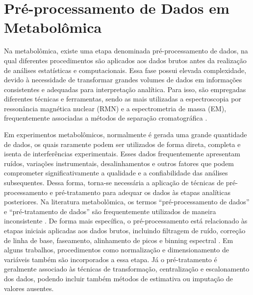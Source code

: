 \section{\textbf{Pré-processamento de Dados em Metabolômica}}

Na metabolômica, existe uma etapa denominada pré-processamento de dados, na qual diferentes procedimentos são aplicados aos dados brutos antes da realização de análises estatísticas e computacionais. Essa fase possui elevada complexidade, devido à necessidade de transformar grandes volumes de dados em informações consistentes e adequadas para interpretação analítica. Para isso, são empregadas diferentes técnicas e ferramentas, sendo as mais utilizadas a espectroscopia por ressonância magnética nuclear (RMN) e a espectrometria de massa (EM), frequentemente associadas a métodos de separação cromatográfica \cite{LILAND2011827}. 

Em experimentos metabolômicos, normalmente é gerada uma grande quantidade de dados, os quais raramente podem ser utilizados de forma direta, completa e isenta de interferências experimentais. Esses dados frequentemente apresentam ruídos, variações instrumentais, desalinhamentos e outros fatores que podem comprometer significativamente a qualidade e a confiabilidade das análises subsequentes. Dessa forma, torna-se necessária a aplicação de técnicas de pré-processamento e pré-tratamento para adequar os dados às etapas analíticas posteriores. Na literatura metabolômica, os termos “pré-processamento de dados” e “pré-tratamento de dados” são frequentemente utilizados de maneira inconsistente \cite{sun2024pretreating}. De forma mais específica, o pré-processamento está relacionado às etapas iniciais aplicadas aos dados brutos, incluindo filtragem de ruído, correção de linha de base, faseamento, alinhamento de picos e binning espectral \cite{sun2024pretreating}. Em alguns trabalhos, procedimentos como normalização e dimensionamento de variáveis também são incorporados a essa etapa. Já o pré-tratamento é geralmente associado às técnicas de transformação, centralização e escalonamento dos dados, podendo incluir também métodos de estimativa ou imputação de valores ausentes.

